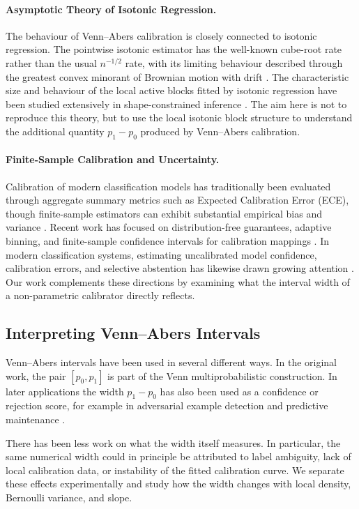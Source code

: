\documentclass[11pt]{article}
\begin{document}
	\paragraph{Asymptotic Theory of Isotonic Regression.}
	The behaviour of Venn--Abers calibration is closely connected to isotonic regression. The pointwise isotonic estimator has the well-known cube-root rate rather than the usual $n^{-1/2}$ rate, with its limiting behaviour described through the greatest convex minorant of Brownian motion with drift \cite{groeneboom1985}. The characteristic size and behaviour of the local active blocks fitted by isotonic regression have been studied extensively in shape-constrained inference \cite{wright1981, robertson1988, groeneboom2014, han2022}. The aim here is not to reproduce this theory, but to use the local isotonic block structure to understand the additional quantity $p_1-p_0$ produced by Venn--Abers calibration.

	\paragraph{Finite-Sample Calibration and Uncertainty.}
	Calibration of modern classification models has traditionally been evaluated through aggregate summary metrics such as Expected Calibration Error (ECE), though finite-sample estimators can exhibit substantial empirical bias and variance \cite{kumar2019, vaicenavicius2019}. Recent work has focused on distribution-free guarantees, adaptive binning, and finite-sample confidence intervals for calibration mappings \cite{gupta2020}. In modern classification systems, estimating uncalibrated model confidence, calibration errors, and selective abstention has likewise drawn growing attention \cite{kumar2019}. Our work complements these directions by examining what the interval width of a non-parametric calibrator directly reflects.

	\subsection{Interpreting Venn--Abers Intervals}
	Venn--Abers intervals have been used in several different ways. In the original work, the pair $[p_0,p_1]$ is part of the Venn multiprobabilistic construction. In later applications the width $p_1-p_0$ has also been used as a confidence or rejection score, for example in adversarial example detection \cite{peck2019} and predictive maintenance \cite{johansson2023}.

	There has been less work on what the width itself measures. In particular, the same numerical width could in principle be attributed to label ambiguity, lack of local calibration data, or instability of the fitted calibration curve. We separate these effects experimentally and study how the width changes with local density, Bernoulli variance, and slope.
\end{document}

